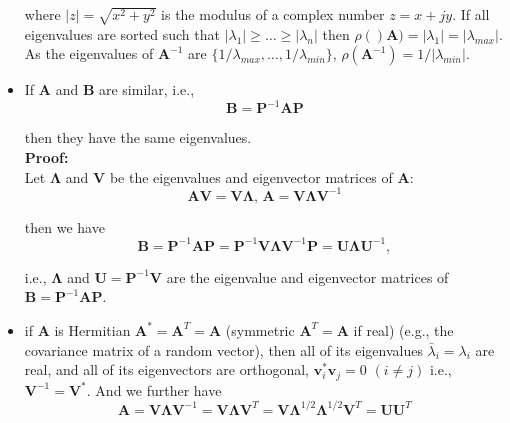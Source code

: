 \documentclass[10pt,b5paper,titlepage]{book}
\begin{document}
\begin{itemize}
where $|z| = \sqrt{x^{2}+y^{2}}$ is the modulus of a complex number $z = x+jy$. If all eigenvalues are sorted such that $|\lambda_{1}| \ge \dots \ge |\lambda_{n}|$ then $\rho()\mathbf{A}) = |\lambda_{1}| = |\lambda_{max}|$. As the eigenvalues of $\mathbf{A}^{-1}$ are $\{1/\lambda_{max},\dots,1/\lambda_{min}\}$, $\rho(\mathbf{A}^{-1}) = 1/|\lambda_{min}|$.

\item If $\mathbf{A}$ and $\mathbf{B}$ are similar, i.e.,
\begin{equation}
\mathbf{B} = \mathbf{P}^{-1}\mathbf{A}\mathbf{P}
\end{equation}

then they have the same eigenvalues.\\

\textbf{Proof:}\\

Let $\mathbf{\Lambda}$ and $\mathbf{V}$ be the eigenvalues and eigenvector matrices of $\mathbf{A}$:
\begin{equation}
\mathbf{A}\mathbf{V} = \mathbf{V}\mathbf{\Lambda}
\text{, }
\mathbf{A} = \mathbf{V}\mathbf{\Lambda}\mathbf{V}^{-1}
\end{equation}

then we have
\begin{equation}
\mathbf{B} = \mathbf{P}^{-1}\mathbf{A}\mathbf{P} = \mathbf{P}^{-1}\mathbf{V}\mathbf{\Lambda}\mathbf{V}^{-1}\mathbf{P} = \mathbf{U}\mathbf{\Lambda}\mathbf{U}^{-1}
,\end{equation}

i.e., $\mathbf{\Lambda}$ and $\mathbf{U} = \mathbf{P}^{-1}\mathbf{V}$ are the eigenvalue and eigenvector matrices of $\mathbf{B} = \mathbf{P}^{-1}\mathbf{A}\mathbf{P}$.

\item if $\mathbf{A}$ is Hermitian $\mathbf{A}^{*} = \mathbf{A}^{T} = \mathbf{A}$ (symmetric $\mathbf{A}^{T} = \mathbf{A}$ if real) (e.g., the covariance matrix of a random vector), then all of its eigenvalues $\bar{\lambda}_{i} = \lambda_{i}$ are real, and all of its eigenvectors are orthogonal, $\mathbf{v}_{i}^{*}\mathbf{v}_{j} = 0$ $(i \neq j)$ i.e., $\mathbf{V}^{-1} = \mathbf{V}^{*}$. And we further have
\begin{equation}
\mathbf{A} = \mathbf{V}\mathbf{\Lambda}\mathbf{V}^{-1} = \mathbf{V}\mathbf{\Lambda}\mathbf{V}^{T} = \mathbf{V}\mathbf{\Lambda}^{1/2}\mathbf{\Lambda}^{1/2}\mathbf{V}^{T} = \mathbf{U}\mathbf{U}^{T}
\end{equation}


\end{itemize}
\end{document}
